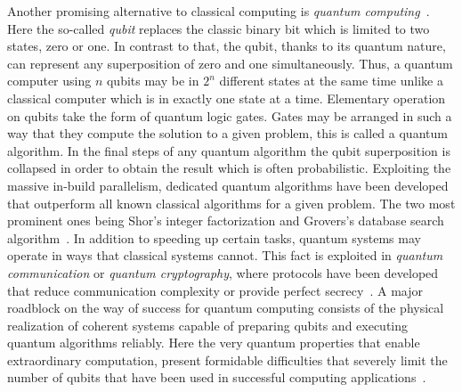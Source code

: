 		Another promising alternative to classical computing is \emph{quantum computing}~\cite{Nielsen:2011:QCQ:1972505}. Here the so-called \emph{qubit} replaces the classic binary bit which is limited to two states, zero or one. In contrast to that, the qubit, thanks to its quantum nature, can represent any superposition of zero and one simultaneously. Thus, a quantum computer using $n$ qubits may be in $2^n$ different states at the same time unlike a classical computer which is in exactly one state at a time. Elementary operation on qubits take the form of quantum logic gates. Gates may be arranged in such a way that they compute the solution to a given problem, this is called a quantum algorithm. In the final steps of any quantum algorithm the qubit superposition is collapsed in order to obtain the result which is often probabilistic. Exploiting the massive in-build parallelism, dedicated quantum algorithms have been developed that outperform all known classical algorithms for a given problem. The two most prominent ones being Shor's integer factorization and Grovers's database search algorithm~\cite{shor1999polynomial,grover1996fast}. In addition to speeding up certain tasks, quantum systems may operate in ways that classical systems cannot. This fact is exploited in \emph{quantum communication} or \emph{quantum cryptography}, where protocols have been developed that reduce communication complexity or provide perfect secrecy~\cite{de2007fundamentals}. A major roadblock on the way of success for quantum computing consists of the physical realization of coherent systems capable of preparing qubits and executing quantum algorithms reliably. Here the very quantum properties that enable extraordinary computation, present formidable difficulties that severely limit the number of qubits that have been used in successful computing applications~\cite{Nielsen:2011:QCQ:1972505}. 


